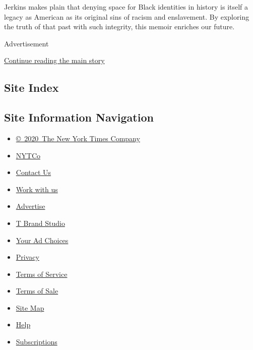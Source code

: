 Jerkins makes plain that denying space for Black identities in history
is itself a legacy as American as its original sins of racism and
enslavement. By exploring the truth of that past with such integrity,
this memoir enriches our future.

Advertisement

\protect\hyperlink{after-bottom}{Continue reading the main story}

\hypertarget{site-index}{%
\subsection{Site Index}\label{site-index}}

\hypertarget{site-information-navigation}{%
\subsection{Site Information
Navigation}\label{site-information-navigation}}

\begin{itemize}
\tightlist
\item
  \href{https://help.nytimes3xbfgragh.onion/hc/en-us/articles/115014792127-Copyright-notice}{©~2020~The
  New York Times Company}
\end{itemize}

\begin{itemize}
\tightlist
\item
  \href{https://www.nytco.com/}{NYTCo}
\item
  \href{https://help.nytimes3xbfgragh.onion/hc/en-us/articles/115015385887-Contact-Us}{Contact
  Us}
\item
  \href{https://www.nytco.com/careers/}{Work with us}
\item
  \href{https://nytmediakit.com/}{Advertise}
\item
  \href{http://www.tbrandstudio.com/}{T Brand Studio}
\item
  \href{https://www.nytimes3xbfgragh.onion/privacy/cookie-policy\#how-do-i-manage-trackers}{Your
  Ad Choices}
\item
  \href{https://www.nytimes3xbfgragh.onion/privacy}{Privacy}
\item
  \href{https://help.nytimes3xbfgragh.onion/hc/en-us/articles/115014893428-Terms-of-service}{Terms
  of Service}
\item
  \href{https://help.nytimes3xbfgragh.onion/hc/en-us/articles/115014893968-Terms-of-sale}{Terms
  of Sale}
\item
  \href{https://spiderbites.nytimes3xbfgragh.onion}{Site Map}
\item
  \href{https://help.nytimes3xbfgragh.onion/hc/en-us}{Help}
\item
  \href{https://www.nytimes3xbfgragh.onion/subscription?campaignId=37WXW}{Subscriptions}
\end{itemize}
